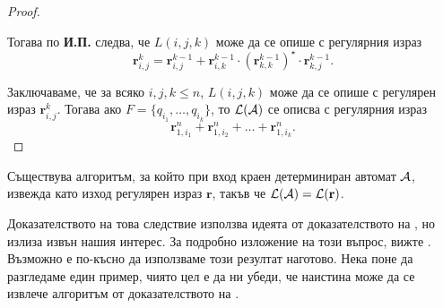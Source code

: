 \begin{proof}
\begin{enumerate}[a)]
    Тогава по {\bf И.П.} следва, че $L(i,j,k)$ може да се опише с регулярния израз
    \begin{equation}
      \label{eq:kleene}
      \mathbf{r}^k_{i,j} = \mathbf{r}^{k-1}_{i,j} + \mathbf{r}^{k-1}_{i,k}\cdot (\mathbf{r}^{k-1}_{k,k})^\star\cdot \mathbf{r}^{k-1}_{k,j}.
    \end{equation}
  \end{enumerate}
  Заключаваме, че за всяко $i,j,k \leq n$, $L(i,j,k)$ може да се опише с регулярен израз $\mathbf{r}^{k}_{i,j}$.
  Тогава ако $F = \{q_{i_1},\dots,q_{i_k}\}$, то $\mathcal{L}(\mathcal{A})$ се описва с регулярния израз
  \[\mathbf{r}^n_{1,i_1} + \mathbf{r}^n_{1,i_2} + \dots + \mathbf{r}^n_{1,i_k}.\]
\end{proof}

\begin{cor}
  Съществува алгоритъм, за който при вход краен детерминиран автомат $\mathcal{A}$,
  извежда като изход регулярен израз $\mathbf{r}$, такъв че $\mathcal{L}(\mathcal{A}) = \mathcal{L}(\mathbf{r})$.
\end{cor}

Доказателството на това следствие използва идеята от доказателството на ,
но излиза извън нашия интерес. За подробно изложение на този въпрос, вижте \cite[стр. 69]{sipser3}.
Възможно е по-късно да използваме този резултат наготово.
Нека поне да разгледаме един пример, чиято цел е да ни убеди, 
че наистина може да се извлече алгоритъм от доказателството на .

